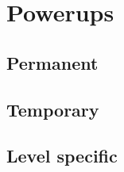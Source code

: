 \chapter{Powerups}
\label{cha:powerups}

\section{Permanent}
\label{sec:permanent}






\section{Temporary}
\label{sec:temporary}




\section{Level specific}
\label{sec:level-powerup}



